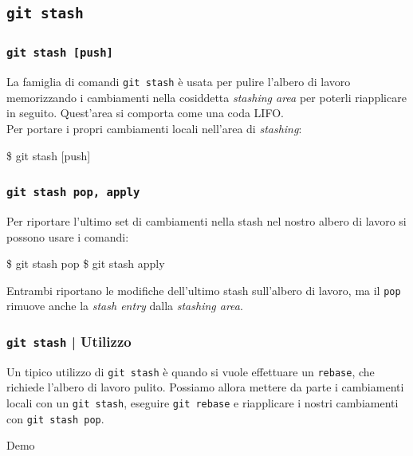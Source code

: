 \documentclass{beamer}
\begin{document}
\subsection{\texttt{git stash}}
\begin{frame}
  \frametitle{\texttt{git stash [push]}}
  La famiglia di comandi \texttt{git stash} \`e usata per pulire l'albero di
  lavoro memorizzando i cambiamenti nella cosiddetta \emph{stashing area} per
  poterli riapplicare in seguito. Quest'area si comporta come una coda LIFO. \\
  Per portare i propri cambiamenti locali nell'area di \emph{stashing}:
  \begin{semiverbatim}
  \$ git stash [push]
  \end{semiverbatim}
\end{frame}

\begin{frame}
  \frametitle{\texttt{git stash pop, apply}}
  Per riportare l'ultimo set di cambiamenti nella stash nel nostro albero di
  lavoro si possono usare i comandi:
  \begin{semiverbatim}
  \$ git stash pop  \$ git stash apply
  \end{semiverbatim}
  Entrambi riportano le modifiche dell'ultimo stash sull'albero di lavoro, ma il
  \texttt{pop} rimuove anche la \emph{stash entry} dalla \emph{stashing area}.
\end{frame}

\begin{frame}
  \frametitle{\texttt{git stash} | Utilizzo}
  Un tipico utilizzo di \texttt{git stash} \`e quando si vuole effettuare un
  \texttt{rebase}, che richiede l'albero di lavoro pulito. Possiamo allora
  mettere da parte i cambiamenti locali con un \texttt{git stash}, eseguire
  \texttt{git rebase} e riapplicare i nostri cambiamenti con \texttt{git stash pop}.
\end{frame}

\begin{frame}[c]
  \centering
  Demo
\end{frame}
\end{document}
